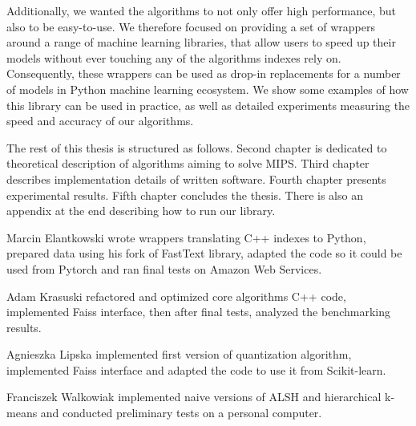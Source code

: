 Additionally, we wanted the algorithms to not only offer high performance, but also to be easy-to-use. We therefore
focused on providing a set of wrappers around a range of machine learning libraries, that allow users to 
speed up their models without ever touching any of the algorithms indexes rely on. Consequently,
these wrappers can be used as drop-in replacements for a number of models in Python machine learning ecosystem.
We show some examples of how this library can be used in practice,
as well as detailed experiments measuring the speed and accuracy of our algorithms.

The rest of this thesis is structured as follows.
Second chapter is dedicated to theoretical description of algorithms aiming to solve MIPS.
Third chapter describes implementation details of written software.
Fourth chapter presents experimental results.
Fifth chapter concludes the thesis.
There is also an appendix at the end describing how to run our library.

Marcin Elantkowski wrote wrappers translating C++ indexes to Python, prepared data using his fork of FastText
library, adapted the code so it could be used from Pytorch and ran final tests on Amazon Web Services.

Adam Krasuski refactored and optimized core algorithms C++ code, implemented Faiss interface,
then after final tests, analyzed the benchmarking results.

Agnieszka Lipska implemented first version of quantization algorithm, implemented Faiss interface and
adapted the code to use it from Scikit-learn.

Franciszek Walkowiak implemented naive versions of ALSH and hierarchical \mbox{k-means} and conducted 
preliminary tests on a personal computer.
